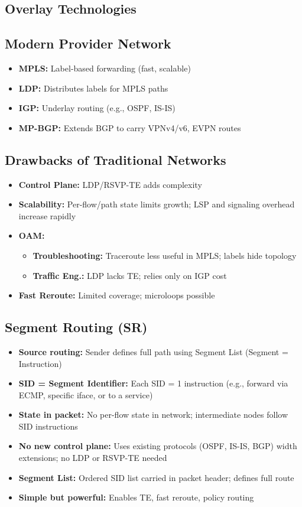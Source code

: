 \begin{multicols*}{5}
		\section{Overlay Technologies}
		\subsection{Modern Provider Network}
		\begin{itemize}
			\item \textbf{MPLS:} Label-based forwarding (fast, scalable)
			\item \textbf{LDP:} Distributes labels for MPLS paths
			\item \textbf{IGP:} Underlay routing (e.g., OSPF, IS-IS)
			\item \textbf{MP-BGP:} Extends BGP to carry VPNv4/v6, EVPN routes
		\end{itemize}
		\subsection{Drawbacks of Traditional Networks}
		\begin{itemize}
			\item \textbf{Control Plane:} LDP/RSVP-TE adds complexity
			\item \textbf{Scalability:} Per-flow/path state limits growth; LSP and signaling overhead increase rapidly
			\item \textbf{OAM:} 
			\begin{itemize}
				\item \textbf{Troubleshooting:} Traceroute less useful in MPLS; labels hide topology
				\item \textbf{Traffic Eng.:} LDP lacks TE; relies only on IGP cost
			\end{itemize}
			\item \textbf{Fast Reroute:} Limited coverage; microloops possible
		\end{itemize}
		\subsection{Segment Routing (SR)}
		\begin{itemize}
			\item \textbf{Source routing:} Sender defines full path using Segment List (Segment = Instruction)
			\item \textbf{SID = Segment Identifier:} Each SID = 1 instruction (e.g., forward via ECMP, specific iface, or to a service)
			\item \textbf{State in packet:} No per-flow state in network; intermediate nodes follow SID instructions
			\item \textbf{No new control plane:} Uses existing protocols (OSPF, IS-IS, BGP) width extensions; no LDP or RSVP-TE needed
			\item \textbf{Segment List:} Ordered SID list carried in packet header; defines full route
			\item \textbf{Simple but powerful:} Enables TE, fast reroute, policy routing
		\end{itemize}

\end{multicols*}
